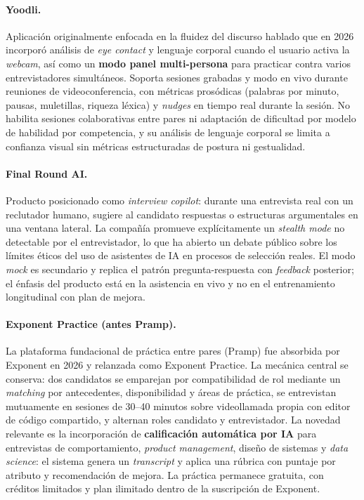 \paragraph{Yoodli.} Aplicación originalmente enfocada en la fluidez
del discurso hablado que en 2026 incorporó análisis de
\textit{eye contact} y lenguaje corporal cuando el usuario activa la
\textit{webcam}, así como un \textbf{modo panel multi-persona} para
practicar contra varios entrevistadores simultáneos. Soporta sesiones
grabadas y modo en vivo durante reuniones de videoconferencia, con
métricas prosódicas (palabras por minuto, pausas, muletillas, riqueza
léxica) y \textit{nudges} en tiempo real durante la sesión. No
habilita sesiones colaborativas entre pares ni adaptación de
dificultad por modelo de habilidad por competencia, y su análisis de
lenguaje corporal se limita a confianza visual sin métricas
estructuradas de postura ni gestualidad.

\paragraph{Final Round AI.} Producto posicionado como
\textit{interview copilot}: durante una entrevista real con un
reclutador humano, sugiere al candidato respuestas o estructuras
argumentales en una ventana lateral. La compañía promueve
explícitamente un \textit{stealth mode} no detectable por el
entrevistador, lo que ha abierto un debate público sobre los límites
éticos del uso de asistentes de IA en procesos de selección reales.
El modo \textit{mock} es secundario y replica el patrón
pregunta-respuesta con \textit{feedback} posterior; el énfasis del
producto está en la asistencia en vivo y no en el entrenamiento
longitudinal con plan de mejora.

\paragraph{Exponent Practice (antes Pramp).} La plataforma fundacional
de práctica entre pares (Pramp) fue absorbida por Exponent en 2026 y
relanzada como Exponent Practice. La mecánica central se conserva: dos
candidatos se emparejan por compatibilidad de rol mediante un
\textit{matching} por antecedentes, disponibilidad y áreas de
práctica, se entrevistan mutuamente en sesiones de 30--40 minutos
sobre videollamada propia con editor de código compartido, y alternan
roles candidato y entrevistador. La novedad relevante es la
incorporación de \textbf{calificación automática por IA} para
entrevistas de comportamiento, \textit{product management}, diseño de
sistemas y \textit{data science}: el sistema genera un \textit{transcript}
y aplica una rúbrica con puntaje por atributo y recomendación de
mejora. La práctica permanece gratuita, con créditos limitados y plan
ilimitado dentro de la suscripción de Exponent.

